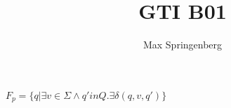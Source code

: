 \documentclass{article}
\author{Max Springenberg}
\title{GTI B01}
\begin{document}
$
F_p = \{
    q 
    | \exists v \in \Sigma \land q' in Q. 
    \exists \delta (q,v,q')
\}
$
\end{document}
